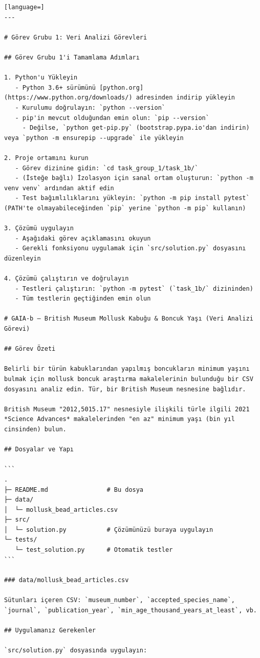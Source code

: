 \begin{appendices}
\begin{lstlisting}[language=]
---

# Görev Grubu 1: Veri Analizi Görevleri

## Görev Grubu 1'i Tamamlama Adımları

1. Python'u Yükleyin
   - Python 3.6+ sürümünü [python.org](https://www.python.org/downloads/) adresinden indirip yükleyin
   - Kurulumu doğrulayın: `python --version`
   - pip'in mevcut olduğundan emin olun: `pip --version`
     - Değilse, `python get-pip.py` (bootstrap.pypa.io'dan indirin) veya `python -m ensurepip --upgrade` ile yükleyin

2. Proje ortamını kurun
   - Görev dizinine gidin: `cd task_group_1/task_1b/`
   - (İsteğe bağlı) İzolasyon için sanal ortam oluşturun: `python -m venv venv` ardından aktif edin
   - Test bağımlılıklarını yükleyin: `python -m pip install pytest` (PATH'te olmayabileceğinden `pip` yerine `python -m pip` kullanın)

3. Çözümü uygulayın
   - Aşağıdaki görev açıklamasını okuyun
   - Gerekli fonksiyonu uygulamak için `src/solution.py` dosyasını düzenleyin

4. Çözümü çalıştırın ve doğrulayın
   - Testleri çalıştırın: `python -m pytest` (`task_1b/` dizininden)
   - Tüm testlerin geçtiğinden emin olun

# GAIA-b — British Museum Mollusk Kabuğu & Boncuk Yaşı (Veri Analizi Görevi)

## Görev Özeti

Belirli bir türün kabuklarından yapılmış boncukların minimum yaşını bulmak için mollusk boncuk araştırma makalelerinin bulunduğu bir CSV dosyasını analiz edin. Tür, bir British Museum nesnesine bağlıdır.

British Museum "2012,5015.17" nesnesiyle ilişkili türle ilgili 2021 *Science Advances* makalelerinden "en az" minimum yaşı (bin yıl cinsinden) bulun.

## Dosyalar ve Yapı

```
.
├─ README.md                # Bu dosya
├─ data/
│  └─ mollusk_bead_articles.csv
├─ src/
│  └─ solution.py           # Çözümünüzü buraya uygulayın
└─ tests/
   └─ test_solution.py      # Otomatik testler
```

### data/mollusk_bead_articles.csv

Sütunları içeren CSV: `museum_number`, `accepted_species_name`, `journal`, `publication_year`, `min_age_thousand_years_at_least`, vb.

## Uygulamanız Gerekenler

`src/solution.py` dosyasında uygulayın:


\end{lstlisting}
\end{appendices}
